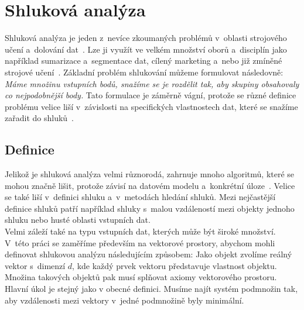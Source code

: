 \chapter{Shluková analýza} \label{sec:clusteranalysis}
Shluková analýza je jeden z~nevíce zkoumaných problémů v~oblasti strojového učení a~dolování dat~\cite{Aggarwal13}. Lze ji využít ve velkém množství oborů a~disciplín jako například sumarizace a~segmentace dat, cílený marketing a~nebo již zmíněné strojové učení~\cite{Jain10, Kaufman90}. Základní problém shlukování můžeme formulovat následovně: \textit{Máme množinu vstupních bodů, snažíme se je rozdělit tak, aby skupiny obsahovaly co nejpodobnější body.} Tato formulace je záměrně vágní, protože se různé definice problému velice liší v~závislosti na specifických vlastnostech dat, které se snažíme zařadit do shluků~\cite{Aggarwal13}. 

\section{Definice}
Jelikož je shluková analýza velmi různorodá, zahrnuje mnoho algoritmů, které se mohou značně lišit, protože závisí na datovém modelu a~konkrétní úloze~\cite{Aggarwal13}. Velice se také liší v~definici shluku a~v~metodách hledání shluků. Mezi nejčastější definice shluků patří například shluky s~malou vzdá\-le\-nos\-tí mezi objekty jednoho shluku nebo husté oblasti vstupních dat.\\

Velmi záleží také na typu vstupních dat, kterých může být široké množství. V~této práci se zaměříme především na vektorové prostory, abychom mohli definovat shlukovou analýzu následujícím způsobem: Jako objekt zvolíme reálný vektor s~dimenzí $d$, kde každý prvek vektoru představuje vlastnost objektu. Množina takových objektů pak musí splňovat axiomy vektorového prostoru. Hlavní úkol je stejný jako v obecné definici. Musíme najít systém podmnožin tak, aby vzdálenosti mezi vektory v~jedné podmnožině byly minimální.

